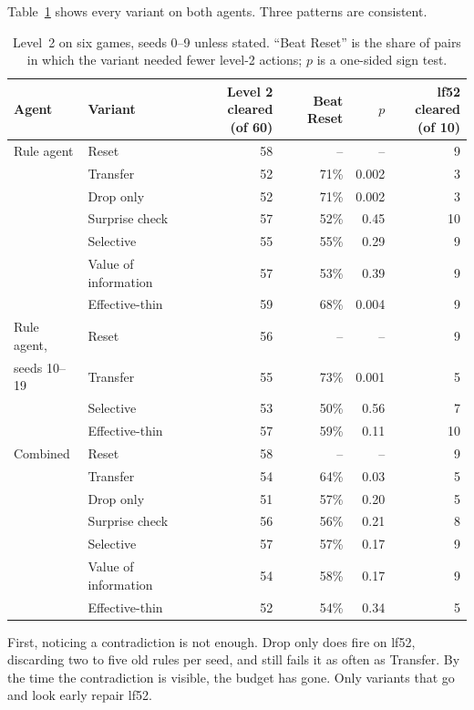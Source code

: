 \documentclass[11pt,a4paper]{article}
\begin{document}
Table~\ref{tab:main} shows every variant on both agents. Three patterns are consistent.

\begin{table}[ht]
\centering
\caption{Level~2 on six games, seeds 0--9 unless stated. ``Beat Reset'' is the share of pairs in which the variant needed fewer level-2 actions; $p$ is a one-sided sign test.}
\label{tab:main}
\small
\begin{tabular}{@{}llrrrr@{}}
\toprule
Agent & Variant & \shortstack[r]{Level 2 cleared\\(of 60)} & Beat Reset & $p$ & \shortstack[r]{lf52 cleared\\(of 10)} \\
\midrule
Rule agent & Reset & 58 & -- & -- & 9 \\
 & Transfer & 52 & 71\% & 0.002 & 3 \\
 & Drop only & 52 & 71\% & 0.002 & 3 \\
 & Surprise check & 57 & 52\% & 0.45 & 10 \\
 & Selective & 55 & 55\% & 0.29 & 9 \\
 & Value of information & 57 & 53\% & 0.39 & 9 \\
 & Effective-thin & 59 & 68\% & 0.004 & 9 \\
\midrule
Rule agent, & Reset & 56 & -- & -- & 9 \\
\quad seeds 10--19 & Transfer & 55 & 73\% & 0.001 & 5 \\
 & Selective & 53 & 50\% & 0.56 & 7 \\
 & Effective-thin & 57 & 59\% & 0.11 & 10 \\
\midrule
Combined & Reset & 58 & -- & -- & 9 \\
 & Transfer & 54 & 64\% & 0.03 & 5 \\
 & Drop only & 51 & 57\% & 0.20 & 5 \\
 & Surprise check & 56 & 56\% & 0.21 & 8 \\
 & Selective & 57 & 57\% & 0.17 & 9 \\
 & Value of information & 54 & 58\% & 0.17 & 9 \\
 & Effective-thin & 52 & 54\% & 0.34 & 5 \\
\bottomrule
\end{tabular}
\end{table}

First, noticing a contradiction is not enough. Drop only does fire on lf52, discarding two to five old rules per seed, and still fails it as often as Transfer. By the time the contradiction is visible, the budget has gone. Only variants that go and look early repair lf52.
\end{document}
